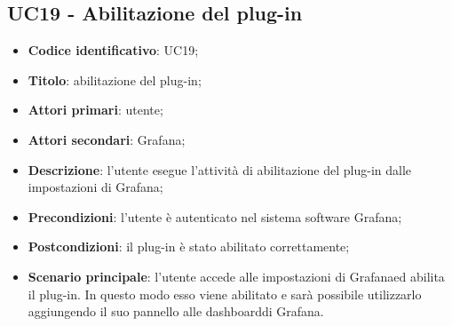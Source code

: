 \subsection{UC19 - Abilitazione del plug-in}
\begin{itemize}
	\item \textbf{Codice identificativo}: UC19;
	\item \textbf{Titolo}: abilitazione del plug-in;
	\item \textbf{Attori primari}: utente;
	\item \textbf{Attori secondari}: Grafana\glo;
	\item \textbf{Descrizione}: l'utente esegue l'attività di abilitazione del plug-in dalle impostazioni di Grafana\glo;
	\item \textbf{Precondizioni}: l'utente è autenticato nel sistema software Grafana\glo;
	\item \textbf{Postcondizioni}: il plug-in è stato abilitato correttamente;
	\item \textbf{Scenario principale}: l'utente accede alle impostazioni di Grafana\glosp ed abilita il plug-in. In questo modo esso viene abilitato e sarà possibile utilizzarlo aggiungendo il suo pannello alle dashboard\glosp di Grafana\glo.
\end{itemize}

